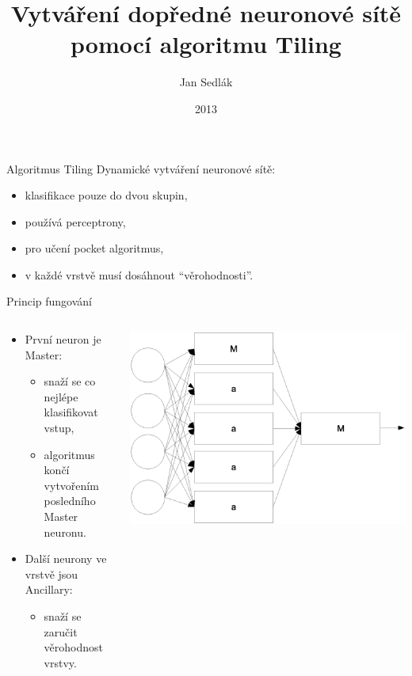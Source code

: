 \documentclass{beamer}
\title{Vytváření dopředné neuronové sítě pomocí algoritmu Tiling}
\institute{FIT VUT v Brně}
\author{Jan Sedlák}
\date{2013}
\begin{document}
\begin{frame}
  \maketitle
\end{frame}

\begin{frame}{Algoritmus Tiling}
  Dynamické vytváření neuronové sítě:
  \begin{itemize}
    \item klasifikace pouze do dvou skupin,
    \item používá perceptrony,
    \item pro učení pocket algoritmus,
    \item v každé vrstvě musí dosáhnout ``věrohodnosti''.
  \end{itemize}
\end{frame}

\begin{frame}{Princip fungování}
\begin{columns}
  \begin{column}{0.47\textwidth}
    \begin{itemize}
    \item První neuron je Master:
      \begin{itemize}
      \item snaží se co nejlépe klasifikovat vstup,
      \item algoritmus končí vytvořením posledního Master neuronu.
      \end{itemize}
    \item Další neurony ve vrstvě jsou Ancillary:
      \begin{itemize}
      \item snaží se zaručit věrohodnost vrstvy.
      \end{itemize}
    \end{itemize}
  \end{column}
  \begin{column}{0.5\textwidth}
    \includegraphics{nn.eps}
  \end{column}
\end{columns}
\end{frame}

\begin{frame}{}
\end{frame}

\begin{frame}{}
\end{frame}

\begin{frame}{}
\end{frame}
\end{document}
